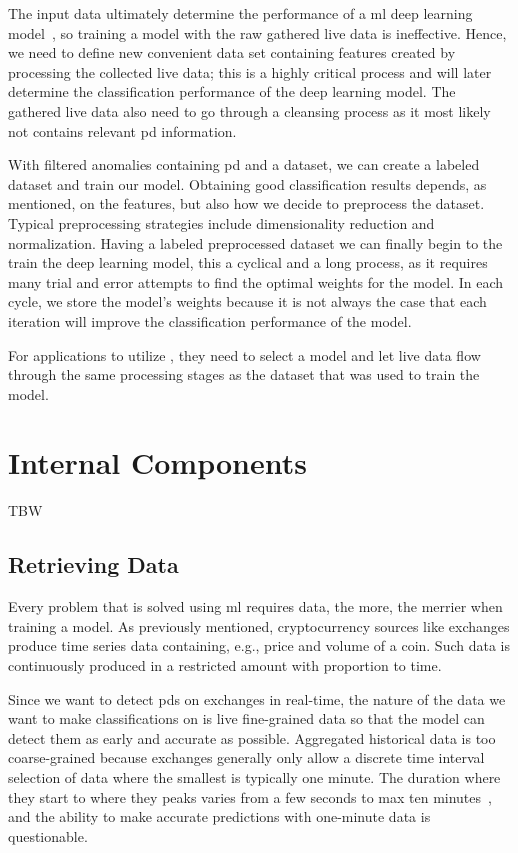 The input data ultimately determine the performance of a \ac{ml} deep learning model~\cite{mike_voets}, so training a model with the raw gathered live data is ineffective. Hence, we need to define new convenient data set containing features created by processing the collected live data; this is a highly critical process and will later determine the classification performance of the deep learning model. The gathered live data also need to go through a cleansing process as it most likely not contains relevant \ac{pd} information.

With filtered anomalies containing \ac{pd} and a dataset, we can create a labeled dataset and train our model. Obtaining good classification results depends, as mentioned, on the features, but also how we decide to preprocess the dataset. Typical preprocessing strategies include dimensionality reduction and normalization. Having a labeled preprocessed dataset we can finally begin to the train the deep learning model, this a cyclical and a long process, as it requires many trial and error attempts to find the optimal weights for the model. In each cycle, we store the model's weights because it is not always the case that each iteration will improve the classification performance of the model.

For applications to utilize \project, they need to select a model and let live data flow through the same processing stages as the dataset that was used to train the model.

\section{Internal Components}
TBW

\subsection{Retrieving Data}
Every problem that is solved using \ac{ml} requires data, the more, the merrier when training a model. As previously mentioned, cryptocurrency sources like exchanges produce time series data containing, e.g., price and volume of a coin. Such data is continuously produced in a restricted amount with proportion to time.

Since we want to detect \acp{pd} on exchanges in real-time, the nature of the data we want to make classifications on is  live fine-grained data so that the model can detect them as early and accurate as possible. Aggregated historical data is too coarse-grained because exchanges generally only allow a discrete time interval selection of data where the smallest is typically one minute. The duration where they start to where they peaks varies from a few seconds to max ten minutes~\cite{P&D_MIT_crypto, P&D_to_the_moon}, and the ability to make accurate predictions with one-minute data is questionable.

